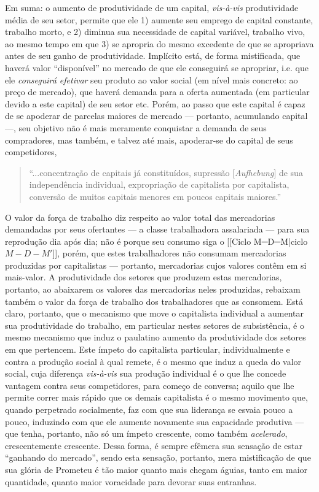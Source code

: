 Em suma: o aumento de produtividade de um capital, \textit{vis-à-vis} produtividade média de seu setor, permite que ele 1) aumente seu emprego de capital constante, trabalho morto, e 2) diminua sua necessidade de capital variável, trabalho vivo, ao mesmo tempo em que 3) se apropria do mesmo excedente de que se apropriava antes de seu ganho de produtividade. Implícito está, de forma mistificada, que haverá valor ``disponível'' no mercado de que ele conseguirá se apropriar, i.e. que ele \textit{conseguirá efetivar} seu produto ao valor social (em nível mais concreto: ao preço de mercado), que haverá demanda para a oferta aumentada (em particular devido a este capital) de seu setor etc. Porém, ao passo que este capital é capaz de se apoderar de parcelas maiores de mercado — portanto, acumulando capital —, seu objetivo não é mais meramente conquistar a demanda de seus compradores, mas também, e talvez até mais, apoderar-se do capital de seus competidores,
\begin{quote}
``...concentração de capitais já constituídos, supressão [\textit{Aufhebung}] de sua independência individual, expropriação de capitalista por capitalista, conversão de muitos capitais menores em poucos capitais maiores.'' \parencite[p. 701]{Marx2017}
\end{quote}

O valor da força de trabalho diz respeito ao valor total das mercadorias demandadas por seus ofertantes — a classe trabalhadora assalariada — para sua reprodução dia após dia; não é porque seu consumo siga o [[Ciclo M─D─M|ciclo $M-D-M'$]], porém, que estes trabalhadores não consumam mercadorias produzidas por capitalistas — portanto, mercadorias cujos valores contêm em si mais-valor. A produtividade dos setores que produzem estas mercadorias, portanto, ao abaixarem os valores das mercadorias neles produzidas, rebaixam também o valor da força de trabalho dos trabalhadores que as consomem. Está claro, portanto, que o mecanismo que move o capitalista individual a aumentar sua produtividade do trabalho, em particular nestes setores de subsistência, é o mesmo mecanismo que induz o paulatino aumento da produtividade dos setores em que pertencem. Este ímpeto do capitalista particular, individualmente e contra a produção social à qual remete, é o mesmo que induz a queda do valor social, cuja diferença \textit{vis-à-vis} sua produção individual é o que lhe concede vantagem contra seus competidores, para começo de conversa; aquilo que lhe permite correr mais rápido que os demais capitalista é o mesmo movimento que, quando perpetrado socialmente, faz com que sua liderança se esvaia pouco a pouco, induzindo com que ele aumente novamente sua capacidade produtiva — que tenha, portanto, não só um ímpeto crescente, como também \textit{acelerado}, crescentemente crescente. Dessa forma, é sempre efêmera sua sensação de estar ``ganhando do mercado'', sendo esta sensação, portanto, mera mistificação de que sua glória de Prometeu é tão maior quanto mais chegam águias, tanto em maior quantidade, quanto maior voracidade para devorar suas entranhas. 

